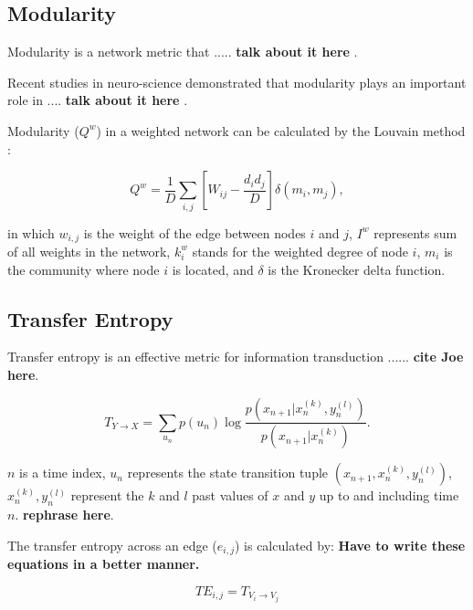 \documentclass[%
 reprint,
 amsmath,amssymb,
 aps,
]{revtex4-2}
\begin{document}
\subsection{\label{sec:level2} Modularity}
Modularity is a network metric that ..... \textbf{talk about it here} \cite{Rubinov2009}.

Recent studies in neuro-science demonstrated that modularity plays an important role in .... \textbf{talk about it here} \cite{Godwin2015}. 
 
Modularity ($Q^w$) in a weighted network can be calculated by the Louvain method \cite{Blondel2008}:
 
\begin{equation}
Q^w = \frac{1}{D} \sum \limits_{i,j} \left[W_{ij} - \frac{d_i d_j}{D} \right] \delta(m_i, m_j),
\label{eq:mod}
\end{equation}

in which $w_{i,j}$ is the weight of the edge between nodes $i$ and $j$, $I^w$ represents sum of all weights in the network, $k_i^w$ stands for the weighted degree of node $i$, $m_i$ is the community where node $i$ is located, and $\delta$ is the Kronecker delta function.

\subsection{\label{sec:level2} Transfer Entropy}

Transfer entropy is an effective metric for information transduction ...... \textbf{cite Joe here}.

\begin{equation}
T_{Y \rightarrow X} = \sum \limits_{u_n} p(u_n) \log \frac{p(x_{n+1}| x_n^{(k)}, y_n^{(l)})}{p(x_{n+1}|x_n^{(k)})}.
\end{equation}

$n$ is a time index, $u_n$ represents the state transition tuple $(x_{n+1}, x_n^{(k)}, y_n^{(l)})$, $x_n^{(k)}, y_n^{(l)}$ represent the $k$ and $l$ past values of $x$ and $y$ up to and including time $n$. \textbf{rephrase here}.


The transfer entropy across an edge ($e_{i,j}$) is calculated by:
\textbf{Have to write these equations in a better manner.}

\begin{equation}
TE_{i,j} = T_{V_i \rightarrow V_j}
\end{equation}
\end{document}
